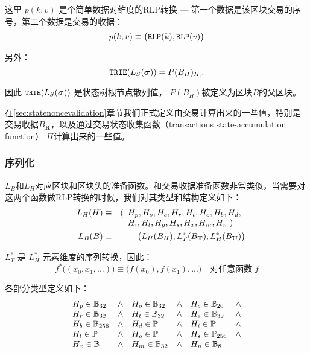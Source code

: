 \documentclass[UTF8,nofonts]{ctexart}
\begin{document}
\begin{multicols}{2}
这里 $p(k, v)$ 是个简单数据对维度的RLP转换 --- 第一个数据是该区块交易的序号，第二个数据是交易的收据：
\begin{equation}
p(k, v) \equiv \big( \mathtt{\small RLP}(k), \mathtt{\small RLP}(v) \big)
\end{equation}

另外：
\begin{equation}
\mathtt{\small TRIE}(L_S(\boldsymbol{\sigma})) = {P(B_H)_H}_r
\end{equation}

因此 $\texttt{\small TRIE}(L_S(\boldsymbol{\sigma}))$ 是状态树根节点散列值， $P(B_H)$被定义为区块$B$的父区块。

在\ref{sec:statenoncevalidation}章节我们正式定义由交易计算出来的一些值，特别是交易收据$B_\mathbf{R}$，以及通过交易状态收集函数（transactions state-accumulation function） $\Pi$计算出来的一些值。

\subsubsection{序列化}

$L_B$和$L_H$对应区块和区块头的准备函数。和交易收据准备函数非常类似，当需要对这两个函数做RLP转换的时候，我们对其类型和结构定义如下：
\begin{eqnarray}
\quad L_H(H) & \equiv & (\begin{array}[t]{l}H_p, H_o, H_c, H_r, H_t, H_e, H_b, H_d,\\ H_i, H_l, H_g, H_s, H_x, H_m, H_n \; )\end{array} \\
\quad L_B(B) & \equiv & \big( L_H(B_H), L_T^*(B_\mathbf{T}), L_H^*(B_\mathbf{U}) \big)
\end{eqnarray}

$L_T^*$ 是 $L_H^*$ 元素维度的序列转换，因此：
\begin{equation}
f^*\big( (x_0, x_1, ...) \big) \equiv \big( f(x_0), f(x_1), ... \big) \quad \text{对任意函数} \; f
\end{equation}

各部分类型定义如下：
\begin{equation}
\begin{array}[t]{lclclcl}
H_p \in \mathbb{B}_{32} & \wedge & H_o \in \mathbb{B}_{32} & \wedge & H_c \in \mathbb{B}_{20} & \wedge \\
H_r \in \mathbb{B}_{32} & \wedge & H_t \in \mathbb{B}_{32} & \wedge & H_e \in \mathbb{B}_{32} & \wedge \\
H_b \in \mathbb{B}_{256} & \wedge & H_d \in \mathbb{P} & \wedge & H_i \in \mathbb{P} & \wedge \\
H_l \in \mathbb{P} & \wedge & H_g \in \mathbb{P} & \wedge & H_s \in \mathbb{P}_{256} & \wedge \\
H_x \in \mathbb{B} & \wedge & H_m \in \mathbb{B}_{32} & \wedge & H_n \in \mathbb{B}_{8}
\end{array}
\end{equation}


\end{multicols}
\end{document}
